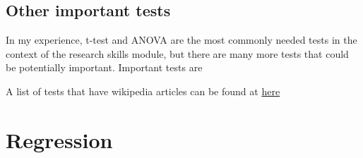 \documentclass{tufte-book} %
\begin{document}
\section{Other important tests}

In my experience, t-test and ANOVA are the most commonly needed tests in the context of the research skills module, but there are many more tests that could be potentially important. Important tests are 


A list of tests that have wikipedia articles can be found at \href{http://en.wikipedia.org/wiki/Category:Statistical_tests}{here} 



\chapter{Regression}





 
\end{document}
